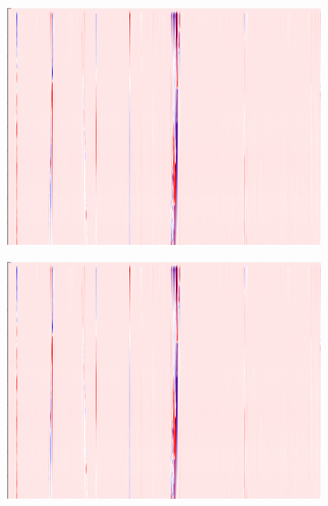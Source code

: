\begin{figure}[!h]
    
    \vspace{1em}
    
    \begin{subfigure}{0.33\textwidth}
        \includegraphics[width=\textwidth]{figures/test.png}
    \end{subfigure}%
    \hfill
    \begin{subfigure}{0.33\textwidth}
        \includegraphics[width=\textwidth]{figures/test.png}
    \end{subfigure}%
    \hfill
    \begin{subfigure}{0.33\textwidth}

\end{subfigure}
\end{figure}
